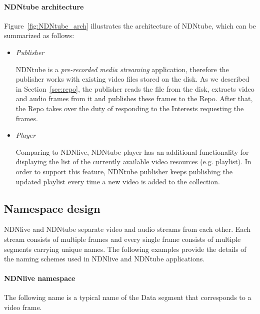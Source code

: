 \paragraph{NDNtube architecture} %
\vspace{0.3cm}
\label{par:NDNtube_arch}
Figure~\ref{fig:NDNtube_arch} illustrates the architecture of NDNtube, which can be summarized as follows:
\begin{itemize}
  \item \textit{Publisher}

    NDNtube is a \textit{pre-recorded media streaming} application, therefore the publisher works with existing video files stored on the disk. As we described in Section~\ref{sec:repo}, the publisher reads the file from the disk, extracts video and audio frames from it and publishes these frames to the Repo. After that, the Repo takes over the duty of responding to the Interests requesting the frames. 

  \item \textit{Player}

    Comparing to NDNlive, NDNtube player has an additional functionality for displaying the list of the currently available video resources (e.g. playlist). In order to support this feature, NDNtube publisher keeps publishing the updated playlist every time a new video is added to the collection.

\end{itemize}


\subsection{Namespace design}

NDNlive and NDNtube separate video and audio streams from each other. Each stream consists of multiple frames and every single frame consists of multiple segments carrying unique names. The following examples provide the details of the naming schemes used in NDNlive and NDNtube applications.

\paragraph{NDNlive namespace} %
\label{par:NDNlive_naming}
\vspace{0.3cm}
The following name is a typical name of the Data segment that corresponds to a video frame.

